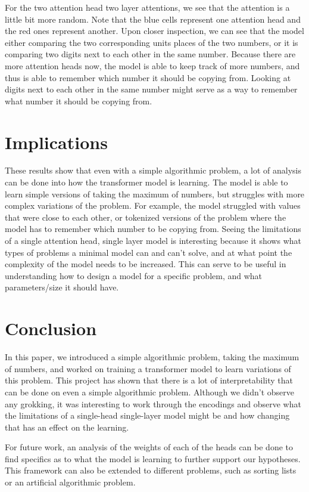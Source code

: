 \documentclass{article}
\begin{document}
For the two attention head two layer attentions, we see that the attention is a little bit more random. Note that the blue cells represent one attention head and the red ones represent another. Upon closer inspection, we can see that the model either comparing the two corresponding units places of the two numbers, or it is comparing two digits next to each other in the same number. Because there are more attention heads now, the model is able to keep track of more numbers, and thus is able to remember which number it should be copying from. Looking at digits next to each other in the same number might serve as a way to remember what number it should be copying from.

\section{Implications}
These results show that even with a simple algorithmic problem, a lot of analysis can be done into how the transformer model is learning. The model is able to learn simple versions of taking the maximum of numbers, but struggles with more complex variations of the problem. For example, the model struggled with values that were close to each other, or tokenized versions of the problem where the model has to remember which number to be copying from. Seeing the limitations of a single attention head, single layer model is interesting because it shows what types of problems a minimal model can and can't solve, and at what point the complexity of the model needs to be increased. This can serve to be useful in understanding how to design a model for a specific problem, and what parameters/size it should have.

\section{Conclusion} 

In this paper, we introduced a simple algorithmic problem, taking the maximum of numbers, and worked on training a transformer model to learn variations of this problem. This project has shown that there is a lot of interpretability that can be done on even a simple algorithmic problem. Although we didn't observe any grokking, it was interesting to work through the encodings and observe what the limitations of a single-head single-layer model might be and how changing that has an effect on the learning.

For future work, an analysis of the weights of each of the heads can be done to find specifics as to what the model is learning to further support our hypotheses. This framework can also be extended to different problems, such as sorting lists or an artificial algorithmic problem.

\newpage


\end{document}
